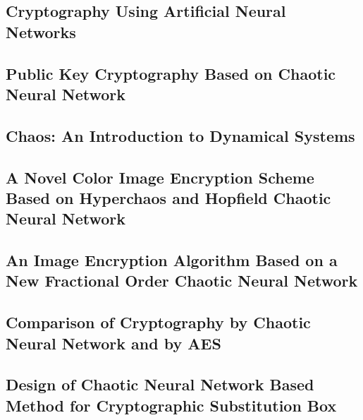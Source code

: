 \documentclass[conference]{IEEEtran}
\begin{document}
\subsection*{\textbf{Cryptography Using Artificial Neural Networks}}\label{subsec:cryptography-using-artificial-neural-networks}\cite{Gujral}

\subsection*{\textbf{Public Key Cryptography Based on Chaotic Neural Network}}\label{subsec:public-key-cryptography-based-on-chaotic-neural-network}\cite{Hamdy}

\subsection*{\textbf{Chaos: An Introduction to Dynamical Systems}}\label{subsec:chaos:-an-introduction-to-dynamical-systems}\cite{Alligood}

\subsection*{\textbf{A Novel Color Image Encryption Scheme Based on Hyperchaos and Hopfield Chaotic Neural Network}}\label{subsec:a-novel-color-image-encryption-scheme-based-on-hyperchaos-and-hopfield-chaotic-neural-network}\cite{Wu2022}

\subsection*{\textbf{An Image Encryption Algorithm Based on a New Fractional Order Chaotic Neural Network}}\label{subsec:an-image-encryption-algorithm-based-on-a-new-fractional-order-chaotic-neural-network}\cite{Li2022}

\subsection*{\textbf{Comparison of Cryptography by Chaotic Neural Network and by AES}}\label{subsec:comparison-of-cryptography-by-chaotic-neural-network-and-by-aes}\cite{Skovajsova2019}

\subsection*{\textbf{Design of Chaotic Neural Network Based Method for Cryptographic Substitution Box}}\label{subsec:design-of-chaotic-neural-network-based-method-for-cryptographic-substitution-box}\cite{Ahmad2016}
\end{document}
